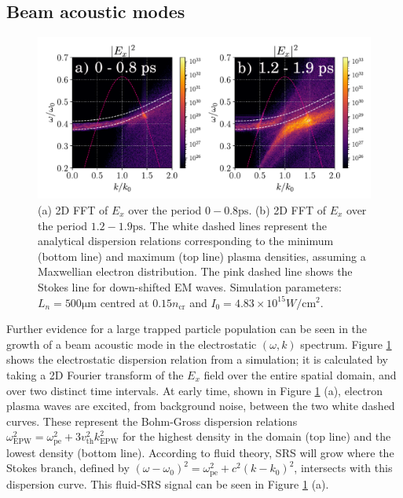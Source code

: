 \subsection{Beam acoustic modes}
\begin{figure}[ht]
    \centering
    \includegraphics[width=\columnwidth]{Chapters/C4_iSRS/fig5_5a_5b.pdf}
    \caption{(a) 2D FFT of $E_x$ over the period $ 0 - 0.8 \si{\pico\second}$. (b) 2D FFT of $E_x$ over the period $1.2 - 1.9                                                                              
    \si{\pico\second}$.
    The white dashed lines represent the analytical dispersion relations corresponding to the minimum (bottom line) and maximum (top line) plasma densities,
    assuming a Maxwellian electron distribution.
    The pink dashed line shows the Stokes line for down-shifted EM waves.
    Simulation parameters: $L_n = 500 \si{\micro\metre} $ centred at $0.15n_\mathrm{cr}$
    and $I_0 = 4.83\times10^{15} \si{W/\centi\metre^2}$.
    }
    \label{fig:BAM}
\end{figure}{}

Further evidence for a large trapped particle population can be seen in the growth of a beam acoustic mode in the electrostatic $(\omega,k)$ spectrum. Figure \ref{fig:BAM} shows the electrostatic dispersion relation from a simulation; it is calculated by taking a 2D Fourier transform of the $E_x$ field over the entire spatial domain, and over two distinct time intervals. At early time, shown in Figure \ref{fig:BAM} (a), electron plasma waves are excited, from background noise, between the two white dashed curves. These
represent the Bohm-Gross dispersion relations $\omega_\mathrm{EPW}^2 = \omega_{\mathrm{pe}}^2 + 3v_\mathrm{th}^2k_\mathrm{EPW}^2$ for the highest density in the
domain (top line) and the lowest density (bottom line). According to fluid theory, SRS will grow where the  Stokes branch, defined by $(\omega-\omega_0)^2 = \omega_{\mathrm{pe}}^2 + c^2(k-k_0)^2$, intersects
with this dispersion curve. This fluid-SRS signal can be seen in Figure \ref{fig:BAM} (a).

